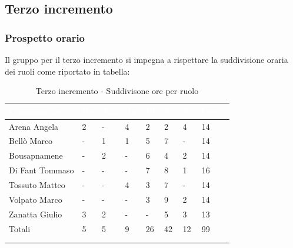     \subsection{Terzo incremento} 
    {
    \subsubsection{Prospetto orario}
    {
    Il gruppo per il terzo incremento si impegna a rispettare la suddivisione oraria dei ruoli come riportato in tabella:
      \setlength{\freewidth}{\dimexpr\textwidth-30\tabcolsep}
      \renewcommand{\arraystretch}{1.0}
      \setlength{\aboverulesep}{0pt}
      \setlength{\belowrulesep}{0pt}
      \begin{longtable}{C{.4\freewidth} C{.1\freewidth} C{.1\freewidth} C{.1\freewidth} C{.1\freewidth} C{.1\freewidth} C{.1\freewidth} C{.1\freewidth} C{.1\freewidth}}
      \toprule
      \textcolor{white}{\textbf{Componente}}&
      \textcolor{white}{\textbf{Re}}&
      \textcolor{white}{\textbf{Am}}&
      \textcolor{white}{\textbf{An}}&
      \textcolor{white}{\textbf{Pt}}&
      \textcolor{white}{\textbf{Pr}}&
      \textcolor{white}{\textbf{Ve}}&
      \textcolor{white}{\textbf{Ore}}\\
      \toprule
      \endhead

      Arena Angela & 2 & - & 4  & 2 & 2 & 4 & 14 \\      
      Bellò Marco & - & 1 & 1 & 5 & 7 & - & 14 \\      
      Bousapnamene & - & 2 & - & 6 & 4 & 2 & 14 \\      
      Di Fant Tommaso & - & - & - & 7 & 8 & 1 & 16 \\      
      Tossuto Matteo & - & - & 4 & 3 & 7 & - & 14 \\      
      Volpato Marco & - & - & - & 3 & 9 & 2 & 14 \\      
      Zanatta Giulio & 3 & 2 & - & - & 5 & 3 & 13 \\      
      Totali & 5 & 5 & 9 & 26 & 42 & 12 & 99 \\
      \bottomrule
      \\
      \caption{Terzo incremento - Suddivisone ore per ruolo}

      \end{longtable} 

}}
